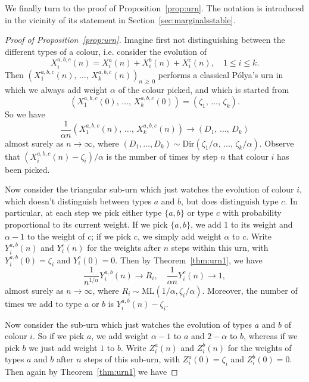 \documentclass[AHL,Unicode,longabstracts,published]{cedram}
\newcommand{\ML}{\mathrm{ML}}
\newcommand{\Dir}{\mathrm{Dir}}
\begin{document}
We finally turn to the proof of Proposition~\ref{prop:urn}. The notation is introduced in the vicinity of its statement in Section~\ref{sec:marginalsstable}.

\begin{proof}[Proof of Proposition~\ref{prop:urn}]
Imagine first not distinguishing between the different types of a colour, i.e. consider the evolution of
\[
X^{a,b,c}_i(n) = X_i^a(n) + X^b_i(n) + X^c_i(n), \quad 1 \le i \le k.
\]
Then $(X^{a,b,c}_1(n),\, \ldots,\,X^{a,b,c}_k(n))_{n\,\ge\,0}$ performs a classical P{\'o}lya's urn in which we always add weight $\alpha$ of the colour picked, and which is started from
\[
\left(X^{a,b,c}_1(0),\,\ldots,\,X^{a,b,c}_k(0)\right) = \left(\zeta_1,\,\ldots,\,\zeta_k\right).
\]
So we have
\begin{equation}\label{eqn:(abc)limit}
\frac{1}{\alpha n} \left(X^{a,b,c}_1(n),\,\ldots,\, X^{a,b,c}_k(n)\right) \to \left(D_1,\, \ldots,\, D_k\right)
\end{equation}
almost surely as $n \to \infty$, where $(D_1, \ldots, D_k) \sim \Dir(\zeta_1/\alpha,\, \ldots, \,\zeta_k/\alpha)$. Observe that $(X^{a,b,c}_i(n) - \zeta_i)/\alpha$ is the number of times by step $n$ that colour $i$ has been picked.

Now consider the triangular sub-urn which just watches the evolution of colour $i$, which doesn't distinguish between types $a$ and $b$, but does distinguish type $c$. In particular, at each step we pick either type $\{a,b\}$ or type $c$ with probability proportional to its current weight. If we pick $\{a,b\}$, we add $1$ to its weight and $\alpha-1$ to the weight of $c$; if we pick $c$, we simply add weight $\alpha$ to $c$. Write $Y^{a,b}_i(n)$ and $Y^c_i(n)$ for the weights after $n$ steps within this urn, with $Y_i^{a,b}(0) = \zeta_i$ and $Y^c_i(0) = 0$. Then by Theorem~\ref{thm:urn1}, we have
\begin{equation}\label{eqn:(ab)climit}
\frac{1}{n^{1/\alpha}} Y_i^{a,b}(n) \to R_i, \quad \frac{1}{\alpha n} Y^c_i(n) \to 1,
\end{equation}
almost surely as $n \to \infty$, where $R_i \sim \ML(1/\alpha, \zeta_i/\alpha)$. Moreover, the number of times we add to type $a$ or $b$ is $Y_i^{a,b}(n) - \zeta_i$.

Now consider the sub-urn which just watches the evolution of types $a$ and $b$ of colour $i$. So if we pick $a$, we add weight $\alpha-1$ to $a$ and $2-\alpha$ to $b$, whereas if we pick $b$ we just add weight $1$ to $b$. Write $Z^a_i(n)$ and $Z^b_i(n)$ for the weights of types $a$ and $b$ after $n$ steps of this sub-urn, with $Z^a_i(0) = \zeta_i$ and $Z^b_i(0) = 0$. Then again by Theorem~\ref{thm:urn1} we have


\end{proof}
\end{document}
